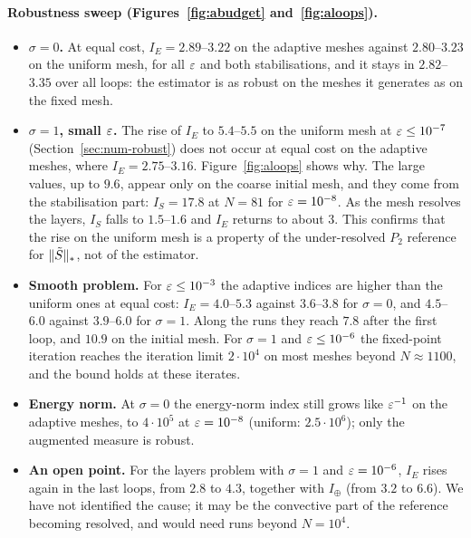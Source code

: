 {\paragraph{Robustness sweep (Figures~\ref{fig:abudget} and~\ref{fig:aloops}).}
\begin{itemize}
  \item \textbf{$\sigma=0$.} At equal cost, $I_E=2.89$--$3.22$ on the adaptive meshes against $2.80$--$3.23$ on the
  uniform mesh, for all $\varepsilon$ and both stabilisations, and it stays in $2.82$--$3.35$ over all loops: the
  estimator is as robust on the meshes it generates as on the fixed mesh.
  \item \textbf{$\sigma=1$, small $\varepsilon$.} The rise of $I_E$ to $5.4$--$5.5$ on the uniform mesh at
  $\varepsilon\le10^{-7}$ (Section~\ref{sec:num-robust}) does not occur at equal cost on the adaptive meshes, where
  $I_E=2.75$--$3.16$. Figure~\ref{fig:aloops} shows why. The large values, up to $9.6$, appear only on the
  coarse initial mesh, and they come from the stabilisation part: $I_S=17.8$ at $N=81$ for $\varepsilon=10^{-8}$. As the
  mesh resolves the layers, $I_S$ falls to $1.5$--$1.6$ and $I_E$ returns to about $3$. This confirms that the
  rise on the uniform mesh is a property of the under-resolved $P_2$ reference for $\|\tilde S\|_*$, not of the
  estimator.
  \item \textbf{Smooth problem.} For $\varepsilon\le10^{-3}$ the adaptive indices are higher than the uniform ones at
  equal cost: $I_E=4.0$--$5.3$ against $3.6$--$3.8$ for $\sigma=0$, and $4.5$--$6.0$ against $3.9$--$6.0$ for
  $\sigma=1$. Along the runs they reach $7.8$ after the first loop, and $10.9$ on the initial mesh. For $\sigma=1$
  and $\varepsilon\le10^{-6}$ the fixed-point iteration reaches the iteration limit $2\cdot10^4$ on most meshes beyond
  $N\approx1100$, and the bound holds at these iterates.
  \item \textbf{Energy norm.} At $\sigma=0$ the energy-norm index still grows like $\varepsilon^{-1}$ on the adaptive meshes,
  to $4\cdot10^5$ at $\varepsilon=10^{-8}$ (uniform: $2.5\cdot10^6$); only the augmented measure is robust.
  \item \textbf{An open point.} For the layers problem with $\sigma=1$ and $\varepsilon=10^{-6}$, $I_E$ rises again in the
  last loops, from $2.8$ to $4.3$, together with $I_\oplus$ (from $3.2$ to $6.6$). We have not identified the cause;
  it may be the convective part of the reference becoming resolved, and would need runs beyond $N=10^4$.
\end{itemize}

}
